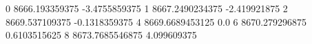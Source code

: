 0 8666.193359375 -3.4755859375
1 8667.2490234375 -2.419921875
2 8669.537109375 -0.1318359375
4 8669.6689453125 0.0
6 8670.279296875 0.6103515625
8 8673.7685546875 4.099609375
